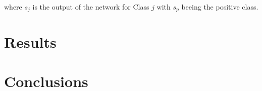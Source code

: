 \documentclass[conference]{IEEEtran}
\begin{document}
where $ s_j $ is the output of the network for Class $ j $ with $ s_p $ beeing the positive class.




\section{Results}
\label{sec:results}





\section{Conclusions}
\label{sec:conclusions}







\printbibliography
\end{document}
